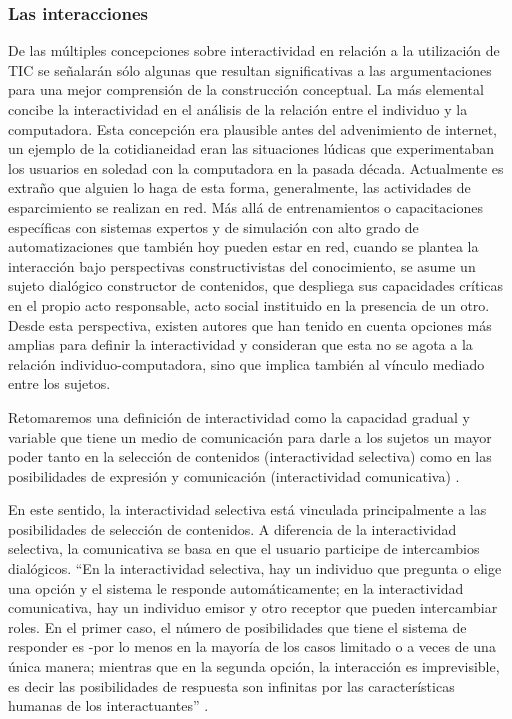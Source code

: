 \subsubsection{Las interacciones} \label{relaciones}

De las múltiples concepciones sobre interactividad en relación a la utilización de TIC se señalarán sólo algunas que resultan significativas a las argumentaciones para una mejor comprensión de la construcción conceptual.
La más elemental concibe la interactividad en el análisis de la relación entre el individuo y la computadora. Esta
concepción era plausible antes del advenimiento de internet,
un ejemplo de la cotidianeidad eran las situaciones lúdicas que experimentaban los usuarios en soledad con la
computadora en la pasada década. Actualmente es extraño que alguien lo haga de esta forma,
generalmente, las actividades de esparcimiento se realizan en red. Más allá de
entrenamientos o capacitaciones específicas con sistemas expertos y de
simulación con alto grado de automatizaciones que también hoy pueden estar en
red, cuando se plantea la interacción bajo perspectivas constructivistas del
conocimiento, se asume un sujeto dialógico constructor de contenidos, que
despliega sus capacidades críticas en el propio acto responsable, acto social instituido en la presencia de un otro.
Desde esta perspectiva, existen autores que han tenido en cuenta opciones más amplias para
definir la interactividad y consideran que esta no se agota a la relación
individuo-computadora, sino que implica también al vínculo mediado entre los
sujetos.

\begin{defi} [Interactividad]
Retomaremos una definición de interactividad como la capacidad gradual y
variable que tiene un medio de comunicación para darle a los sujetos
un mayor poder tanto en la selección de contenidos (interactividad selectiva)
como en las posibilidades de expresión y comunicación (interactividad
comunicativa) \cite{lxxiv}.
\end{defi} 

En este sentido, la interactividad selectiva está vinculada principalmente a las posibilidades de
selección de contenidos. A diferencia de la interactividad selectiva, la
comunicativa se basa en que el usuario participe de intercambios dialógicos. “En
la interactividad selectiva, hay un individuo que pregunta o elige una opción y
el sistema le responde automáticamente; en la interactividad comunicativa, hay
un individuo emisor y otro receptor que pueden intercambiar roles. En el primer
caso, el número de posibilidades que tiene el sistema de responder es -por lo
menos en la mayoría de los casos limitado o a veces de una única manera;
mientras que en la segunda opción, la interacción es imprevisible, es decir las
posibilidades de respuesta son infinitas por las características humanas de los
interactuantes” \cite{lxxiv}.

